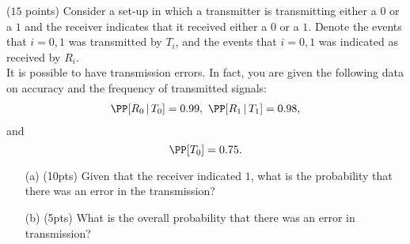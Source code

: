 \documentclass[reqno,letterpaper, onsided,10pt]{amsart}
\theoremstyle{definition}
\newcommand{\sol}[1]{\par\noindent{\bf Solution:} #1}
\renewcommand{\sol}[1]{}
\begin{document}
\sol{ 
Let $A$ denote the event that the colors of
the balls drawn are not all the same, and let $B$ denote the event
that there are exactly two black balls and two red balls. We are
looking for $\PP[B|A]$. Since $B\subseteq A$, we have
\[ \PP[B|A]=\PP[B\cap A]/\PP[A]=\PP[B]/\PP[A].\]
To compute $\PP[A]$, we note that the event $A^c$ consists of only two
elementary outcomes: either all balls are black or all balls are red. 
The probability of picking all red balls is 
\[ \frac{\binom{5}{4}}{ \binom{9}{4}} \]
while the probability of picking all black balls is
\[ \frac{\binom{4}{4}}{\binom{9}{4}}=\frac{1}{\binom{9}{4}}. \]
Putting these two together, we obtain
\[ \PP[A]= 1-\frac{\binom{5}{4}+1}{\binom{9}{4}}.\]
To compute $\PP[B]$ we note that we can choose $2$ red balls out of 
$5$ in $\binom{5}{2}$ ways and, then, for each such choice, we have
$\binom{4}{2}$ ways of choosing $2$ black balls from the set of 4 
black balls. Therefore,
\[ \PP[B] = \left( \binom{5}{2} \times \binom{4}{2} \right) \Big/
\binom{9}{4}.\]
Finally,
\[ \PP[B|A] = \frac{ \binom{5}{2} \binom{4}{2} }{ \binom{9}{4} -
\binom{5}{4} - 1 }= \frac{ 10 \times 6}{ 126 - 5 - 1}= \frac{1}{2}.\]
}

\medskip

\begin{problem} ($15$ points)%
Consider a set-up in which a transmitter is transmitting either a $0$
or a $1$ and the receiver indicates that it received either a $0$ or a
$1$. Denote the events that $i =0,1$ was transmitted by $T_i$, and the
events that $i=0,1$ was indicated as received by $R_i$. \\
It is possible to have transmission errors. In fact, you are given the
following data on accuracy and the frequency of transmitted signals: 
\begin{equation}%
    \nonumber 
    \begin{split}
      \PP[R_0 \, | \, T_0] = 0.99,  \ 
    \PP[R_1 \, | \, T_1] = 0.98,
    \end{split}
\end{equation}   
and
\[ \PP[T_0]=0.75.\]
\begin{itemize}
  \item[(a)]  (10pts) Given that the receiver indicated $1$, what is the probability that
there was an error in the transmission?
\vskip7cm
\item[(b)]  (5pts) What is the overall probability that there was an error in
transmission?
\end{itemize}
\end{problem}
\end{document}
